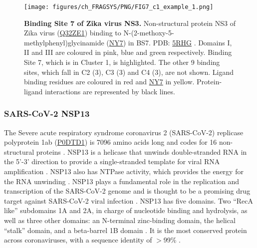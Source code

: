 {\begin{figure}[htb!]
    \centering
    \texttt{[image: figures/ch\_FRAGSYS/PNG/FIG7\_c1\_example\_1.png]}
    \caption[Binding Site 7 of Zika virus NS3]{\textbf{Binding Site 7 of Zika virus NS3.} Non-structural protein NS3 of Zika virus (\href{https://www.uniprot.org/uniprotkb/Q32ZE1/entry}{Q32ZE1}) binding to N-(2-methoxy-5-methylphenyl)glycinamide (\href{https://www.ebi.ac.uk/pdbe-srv/pdbechem/chemicalCompound/show/NY7}{NY7}) in BS7. PDB: \href{https://www.ebi.ac.uk/pdbe/entry/pdb/5RHG}{5RHG} \cite{PDB_5RHG}. Domains I, II and III are coloured in pink, blue and green respectively. Binding Site 7, which is in Cluster 1, is highlighted. The other 9 binding sites, which fall in C2 (3), C3 (3) and C4 (3), are not shown. Ligand binding residues are coloured in red and \href{https://www.ebi.ac.uk/pdbe-srv/pdbechem/chemicalCompound/show/NY7}{NY7} in yellow. Protein-ligand interactions are represented by black lines.}
    \label{fig:c1_example_1}
\end{figure}

\vspace{-20pt} %

\subsubsection{SARS-CoV-2 NSP13}

The Severe acute respiratory syndrome coronavirus 2 (SARS-CoV-2) replicase polyprotein 1ab (\href{https://www.uniprot.org/uniprotkb/P0DTD1/entry}{P0DTD1}) is 7096 amino acids long and codes for 16 non-structural proteins \cite{NAQVI_2020_SARSCOV2}. NSP13 is a helicase that unwinds double-stranded RNA in the 5’-3’ direction to provide a single-stranded template for viral RNA amplification \cite{YUE_2022_SARSCOV2}. NSP13 also has NTPase activity, which provides the energy for the RNA unwinding \cite{SHU_2020_SARSCOV2}. NSP13 plays a fundamental role in the replication and transcription of the SARS-CoV-2 genome and is thought to be a promising drug target against SARS-CoV-2 viral infection \cite{ZENG_2021_SARSCOV2}. NSP13 has five domains. Two ``RecA like'' subdomains 1A and 2A, in charge of nucleotide binding and hydrolysis, as well as three other domains: an N-terminal zinc-binding domain, the helical ``stalk'' domain, and a beta-barrel 1B domain \cite{ROMEO_2022_SARSCOV2}. It is the most conserved protein across coronaviruses, with a sequence identity of $>$99\% \cite{RICCI_2022_SARSCOV2}.

}
